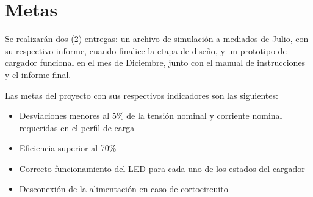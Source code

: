 \section{Metas}



Se realizarán dos (2) entregas: un archivo de simulación a mediados de Julio,
con su respectivo informe,
cuando finalice la etapa de diseño,
y un prototipo de cargador funcional en el mes de Diciembre,
junto con el manual de instrucciones y el informe final.

Las metas del proyecto con sus respectivos indicadores son las siguientes:

\begin{itemize}
    \item Desviaciones menores al 5\% de la tensión nominal y corriente nominal requeridas en el perfil de carga
    \item Eficiencia superior al 70\% %
    \item Correcto funcionamiento del LED para cada uno de los estados del cargador
    \item Desconexión de la alimentación en caso de cortocircuito
\end{itemize}